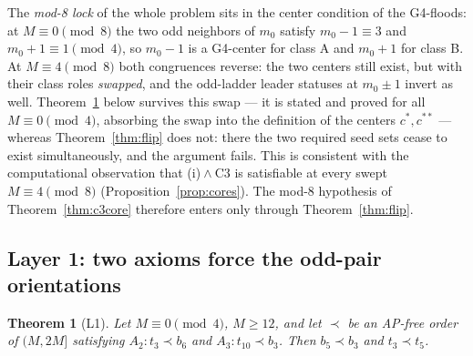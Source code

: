 \documentclass[11pt]{article}
\newtheorem{theorem}{Theorem}
\theoremstyle{definition}
\begin{document}
The \emph{mod-8 lock} of the whole problem sits in the center condition
of the G4-floods: at $M \equiv 0 \pmod 8$ the two odd neighbors of
$m_0$ satisfy $m_0 - 1 \equiv 3$ and $m_0 + 1 \equiv 1 \pmod 4$, so
$m_0 - 1$ is a G4-center for class A and $m_0 + 1$ for class B. At
$M \equiv 4 \pmod 8$ both congruences reverse: the two centers still
exist, but with their class roles \emph{swapped}, and the odd-ladder
leader statuses at $m_0 \pm 1$ invert as well. Theorem~\ref{thm:l1}
below survives this swap --- it is stated and proved for all
$M \equiv 0 \pmod 4$, absorbing the swap into the definition of the
centers $c^{*}, c^{**}$ --- whereas Theorem~\ref{thm:flip} does not: there
the two required seed sets cease to exist simultaneously, and the argument
fails. This is consistent with the computational observation that
(i)${}\wedge{}\mathrm{C3}$ is satisfiable at every swept
$M \equiv 4 \pmod 8$ (Proposition~\ref{prop:cores}). The mod-$8$ hypothesis of
Theorem~\ref{thm:c3core} therefore enters only through
Theorem~\ref{thm:flip}.

\subsection{Layer 1: two axioms force the odd-pair orientations}
\label{sec:l1}

\begin{theorem}[L1]\label{thm:l1}
Let $M \equiv 0 \pmod 4$, $M \ge 12$, and let $\prec$ be an AP-free
order of $(M, 2M]$ satisfying $A_2\colon t_3 \prec b_6$ and
$A_3\colon t_{10} \prec b_3$. Then $b_5 \prec b_3$ and $t_3 \prec t_5$.
\end{theorem}
\end{document}
